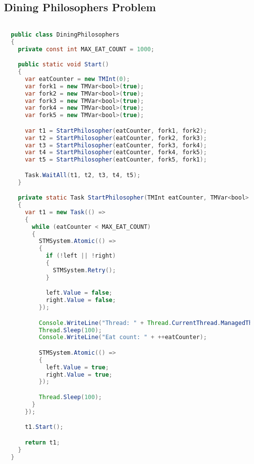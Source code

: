 \subsection{Dining Philosophers Problem}
\begin{lstlisting}[label=lst:impl_dining_lib,
  caption={STM Library Based Dining Philosophers Implementation},
  language=Java,  
  showspaces=false,
  showtabs=false,
  breaklines=true,
  showstringspaces=false,
  breakatwhitespace=true,
  commentstyle=\color{greencomments},
  keywordstyle=\color{bluekeywords},
  stringstyle=\color{redstrings},
  escapechar=~,
  morekeywords={atomic, retry, orelse, var, get, set, ref, out, readonly, virtual, override, region, endregion, foreach, lock}]  % Start your code-block

  public class DiningPhilosophers
  {
    private const int MAX_EAT_COUNT = 1000;

    public static void Start()
    {
      var eatCounter = new TMInt(0);
      var fork1 = new TMVar<bool>(true);
      var fork2 = new TMVar<bool>(true);
      var fork3 = new TMVar<bool>(true);
      var fork4 = new TMVar<bool>(true);
      var fork5 = new TMVar<bool>(true);

      var t1 = StartPhilosopher(eatCounter, fork1, fork2);
      var t2 = StartPhilosopher(eatCounter, fork2, fork3);
      var t3 = StartPhilosopher(eatCounter, fork3, fork4);
      var t4 = StartPhilosopher(eatCounter, fork4, fork5);
      var t5 = StartPhilosopher(eatCounter, fork5, fork1);

      Task.WaitAll(t1, t2, t3, t4, t5);
    }

    private static Task StartPhilosopher(TMInt eatCounter, TMVar<bool> left, TMVar<bool> right)
    {
      var t1 = new Task(() =>
      {
        while (eatCounter < MAX_EAT_COUNT)
        {
          STMSystem.Atomic(() =>
          {
            if (!left || !right)
            {
              STMSystem.Retry();
            }

            left.Value = false;
            right.Value = false;
          });

          Console.WriteLine("Thread: " + Thread.CurrentThread.ManagedThreadId + " eating.");
          Thread.Sleep(100);
          Console.WriteLine("Eat count: " + ++eatCounter);

          STMSystem.Atomic(() =>
          {
            left.Value = true;
            right.Value = true;
          });

          Thread.Sleep(100);
        }
      });

      t1.Start();

      return t1;
    }
  }
\end{lstlisting}

